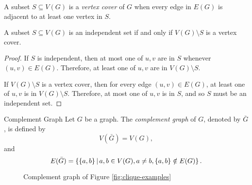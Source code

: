 \begin{defn}
    A subset $S \subseteq V(G)$ is a \emph{vertex cover} of $G$ when every edge in $E(G)$ is adjacent to at least one vertex in $S$.
\end{defn}

\begin{prop}
    A subset $S \subseteq V(G)$ is an independent set if and only if $V(G)\setminus S$ is a vertex cover.
\end{prop}

\begin{proof}
    If $S$ is independent, then at most one of $u, v$ are in $S$ whenever $(u, v) \in E(G)$. Therefore, at least one of $u, v$ are in $V(G) \setminus S$.

    If $V(G)\setminus S$ is a vertex cover, then for every edge $(u, v) \in E(G)$, at least one of $u, v$ is in $V(G)\setminus S$. Therefore, at most one of $u, v$ is in $S$, and so $S$ must be an independent set.
\end{proof}

\begin{defn}Complement Graph\proofbreak
    Let $G$ be a graph. The \emph{complement graph} of $G$, denoted by $\bar{G}$, is defined by
    \[V(\bar{G}) = V(G),\] and
    \[E(\bar{G}) = \left\{\{a, b\} \,\middle|\, a, b \in V(G), a \neq b, \{a, b\} \notin E(G) \right\}.\]
\end{defn}

\begin{figure}[ht!]
    \centering
\caption{Complement graph of Figure \ref{fig:clique-examples}}
\label{fig:complement-example}
\end{figure}

